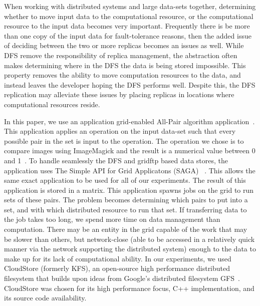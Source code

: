 \documentclass[a4paper,11pt]{article}
\newcommand{\jhanote}[1]{ {\textcolor{red} { ***Jha: #1 }}}
\newcommand{\jhanote}[1]{}
\begin{document}
When working with distributed systems and large data-sets together, determining whether to move input data to the computational resource, or the computational resource to the input data becomes very important. Frequently there is be more than one copy of the input data for fault-tolerance reasons, then the added issue of deciding between the two or more replicas becomes an issues as well. While DFS remove the responsibility of replica management, the abstraction often makes determining where in the DFS the data is being stored impossible. This property removes the ability to move computation resources to the data, and instead leaves the developer hoping the DFS performs well. Despite this, the DFS replication may alleviate these issues by placing replicas in locations where computational resources reside.


In this paper, we use an application grid-enabled All-Pair algorithm application~\cite{Interop, AllPairs}. This application applies an operation on the input data-set such that every possible pair in the set is input to the operation. The operation we chose is to compare images using ImageMagick and the result is a numerical value between 0 and 1~\cite{imagemagick}. To handle seamlessly the DFS and gridftp based data stores, the application uses The Simple API for Grid Applicatons (SAGA) ~\cite{saga_web}. This allows the same exact application to be used for all of our experiments. The result of this application is stored in a matrix. This application spawns jobs on the grid to run sets of these pairs. The problem becomes determining which pairs to put into a set, and with which distributed resource to run that set. If transferring data to the job takes too long, we spend more time on data management than computation. There may be an entity in the grid capable of the work that may be slower than others, but network-close (able to be accessed in a relatively quick manner via the network supporting the distributed system) enough to the data to make up for its lack of computational ability. In our experiments, we used CloudStore (formerly KFS), an open-source high performance distributed filesystem that builds upon ideas from Google's distributed filesystem GFS~\cite{kfs_web}. CloudStore was chosen for its high performance focus, C++ implementation, and its source code availability.
\end{document}
